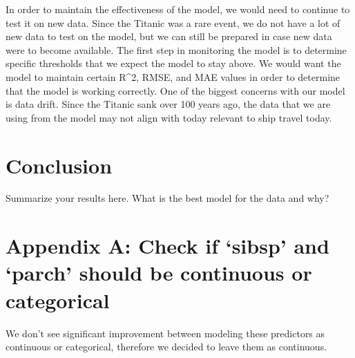 \documentclass[
  letterpaper,
  DIV=11,
  numbers=noendperiod]{scrartcl}
\begin{document}
In order to maintain the effectiveness of the model, we would need to
continue to test it on new data. Since the Titanic was a rare event, we
do not have a lot of new data to test on the model, but we can still be
prepared in case new data were to become available. The first step in
monitoring the model is to determine specific thresholds that we expect
the model to stay above. We would want the model to maintain certain
R\^{}2, RMSE, and MAE values in order to determine that the model is
working correctly. One of the biggest concerns with our model is data
drift. Since the Titanic sank over 100 years ago, the data that we are
using from the model may not align with today relevant to ship travel
today.

\section{Conclusion}\label{conclusion}

Summarize your results here. What is the best model for the data and
why?

\section*{Appendix A: Check if `sibsp' and `parch' should be continuous
or categorical}\label{appendix_A}

We don't see significant improvement between modeling these predictors
as continuous or categorical, therefore we decided to leave them as
continuous.
\end{document}

